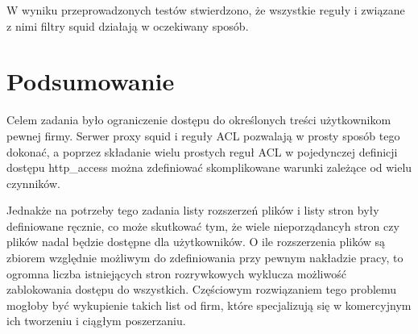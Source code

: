 \documentclass{article}
\begin{document}
W wyniku przeprowadzonych testów stwierdzono, że wszystkie reguły i związane z nimi filtry squid działają w oczekiwany sposób.

\section{Podsumowanie}
Celem zadania było ograniczenie dostępu do określonych treści użytkownikom pewnej firmy.
Serwer proxy squid i reguły ACL pozwalają w prosty sposób tego dokonać,
a poprzez składanie wielu prostych reguł ACL w pojedynczej definicji dostępu http\_access można zdefiniować skomplikowane warunki zależące od wielu czynników.
\par
Jednakże na potrzeby tego zadania listy rozszerzeń plików i listy stron były definiowane ręcznie, co może skutkować tym, że wiele nieporządancyh stron czy plików nadal będzie dostępne dla użytkowników.
O ile rozszerzenia plików są zbiorem względnie możliwym do zdefiniowania przy pewnym nakładzie pracy,
to ogromna liczba istniejących stron rozrywkowych wyklucza możliwość zablokowania dostępu do wszystkich.
Częściowym rozwiązaniem tego problemu mogłoby być wykupienie takich list od firm, które specjalizują się w komercyjnym ich tworzeniu i ciągłym poszerzaniu.
\end{document}
